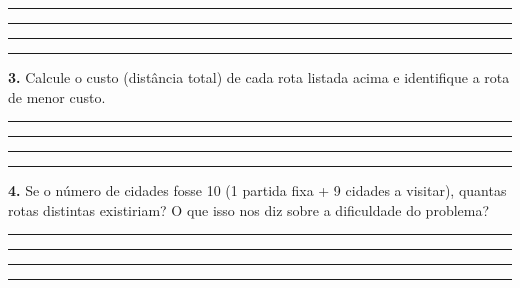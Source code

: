 \documentclass[
  12pt,
  oneside,
  a4paper,
  english,
  brazilian
  ]{abntex2}
\theoremstyle{definition}
\def\vspace#1{ }%
\begin{document}
\begin{apendicesenv}
\vspace{0.3cm}
\noindent\rule{\textwidth}{0.4pt}\vspace{0.3cm}
\noindent\rule{\textwidth}{0.4pt}\vspace{0.3cm}
\noindent\rule{\textwidth}{0.4pt}\vspace{0.3cm}
\noindent\rule{\textwidth}{0.4pt}

\textbf{3.} Calcule o custo (distância total) de cada rota listada acima e identifique a rota de menor custo.

\vspace{0.3cm}
\noindent\rule{\textwidth}{0.4pt}\vspace{0.3cm}
\noindent\rule{\textwidth}{0.4pt}\vspace{0.3cm}
\noindent\rule{\textwidth}{0.4pt}\vspace{0.3cm}
\noindent\rule{\textwidth}{0.4pt}

\textbf{4.} Se o número de cidades fosse 10 (1 partida fixa + 9 cidades a visitar), quantas rotas distintas existiriam? O que isso nos diz sobre a dificuldade do problema?

\vspace{0.3cm}
\noindent\rule{\textwidth}{0.4pt}\vspace{0.3cm}
\noindent\rule{\textwidth}{0.4pt}\vspace{0.3cm}
\noindent\rule{\textwidth}{0.4pt}\vspace{0.3cm}
\noindent\rule{\textwidth}{0.4pt}

\end{apendicesenv}
\end{document}
